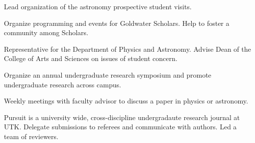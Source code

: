 \documentclass[letterpaper]{deedy-resume} %
\begin{document}

Lead organization of the astronomy prospective student visits.
\sectionspace %



Organize programming and events for Goldwater Scholars. Help to foster a
community among Scholars.
\sectionspace %



Representative for the Department of Physics and Astronomy. Advise Dean of the College of Arts and Sciences
on issues of student concern.
\sectionspace %



Organize an annual undergraduate research symposium and promote undergraduate research across campus.
\sectionspace %



Weekly meetings with faculty advisor to discuss a paper in physics or astronomy.
\sectionspace %

\protected{}

Pursuit is a university wide, cross-discipline undergradaute research journal at UTK. Delegate submissions to referees and communicate with authors. Led a team of reviewers.
\sectionspace %
\end{document}
